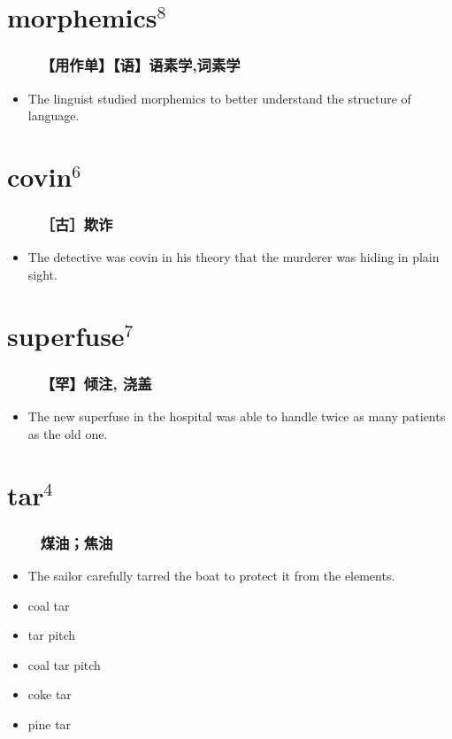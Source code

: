 \documentclass[UTF8,4pt,a3paper,space]{article}
\begin{document}
\begin{multicols}{4}
\section{morphemics$^8$}
\subsubsection*{\ \ \ \ 【用作单】【语】语素学,词素学}\begin{itemize}
\itemsep-0.5em
    \item The linguist studied morphemics to better understand the structure of language. 
\end{itemize}
\hrulefill


\section{covin$^6$}
\subsubsection*{\ \ \ \ ［古］欺诈}\begin{itemize}
\itemsep-0.5em
    \item The detective was covin in his theory that the murderer was hiding in plain sight. 
\end{itemize}
\hrulefill


\section{superfuse$^7$}
\subsubsection*{\ \ \ \ 【罕】倾注, 浇盖}\begin{itemize}
\itemsep-0.5em
    \item The new superfuse in the hospital was able to handle twice as many patients as the old one. 
\end{itemize}
\hrulefill


\section{tar$^4$}
\subsubsection*{\ \ \ \ 煤油；焦油}\begin{itemize}
\itemsep-0.5em
    \item The sailor carefully tarred the boat to protect it from the elements. 
\end{itemize}
\begin{itemize}
\itemsep-0.5em
   \item coal tar   \item tar pitch   \item coal tar pitch   \item coke tar   \item pine tar\end{itemize}
\hrulefill


\end{multicols}
\end{document}
